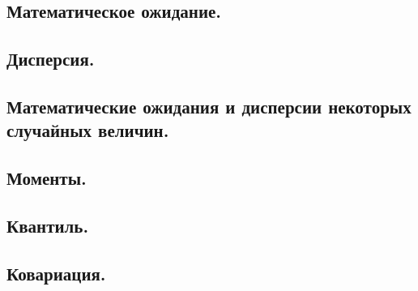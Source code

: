 \subsection{Математическое ожидание.}



\newpage
\subsection{Дисперсия.}



\newpage
\subsection{Математические ожидания и дисперсии некоторых случайных величин.}



\newpage
\subsection{Моменты.}



\newpage
\subsection{Квантиль.}



\newpage
\subsection{Ковариация.}
